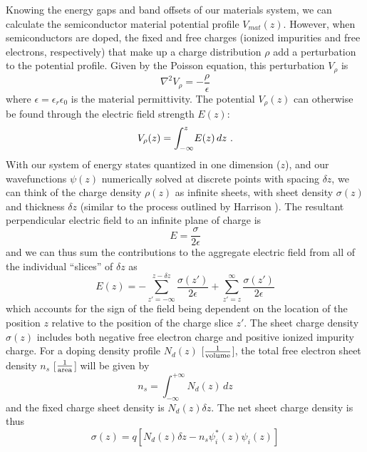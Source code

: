 \documentclass[12pt]{report}
\begin{document}
Knowing the energy gaps and band offsets of our materials system, we can calculate the semiconductor material potential profile $V_{mat}(z)$. However, when semiconductors are doped, the fixed and free charges (ionized impurities and free electrons, respectively) that make up a charge distribution $\rho$ add a perturbation to the potential profile.  Given by the Poisson equation, this perturbation $V_\rho$ is
\begin{equation}
\nabla^2 V_\rho = -\frac{\rho}{\epsilon}
\end{equation}
where $\epsilon = \epsilon_r \epsilon_0$ is the material permittivity.  The potential $V_\rho(z)$ can otherwise be found through the electric field strength $E(z)$:
\begin{equation}
V_\rho(z)=\int_{-\infty}^z\!E(z)\,dz \textnormal{~.}
\end{equation}
With our system of energy states quantized in one dimension ($z$), and our wavefunctions $\psi(z)$ numerically solved at discrete points with spacing $\delta\!z$, we can think of the charge density $\rho(z)$ as infinite sheets, with sheet density $\sigma(z)$ and thickness $\delta\!z$ (similar to the process outlined by Harrison \cite{Harrison}).  The resultant perpendicular electric field to an infinite plane of charge is
\begin{equation}
E = \frac{\sigma}{2 \epsilon}
\end{equation}
and we can thus sum the contributions to the aggregate electric field from all of the individual ``slices'' of $\delta\!z$ as
\begin{equation}
E(z) = - \sum_{z'=-\infty}^{z-\delta\!z} \frac{\sigma(z')}{2\epsilon} +  \sum_{z'=z}^{\infty} \frac{\sigma(z')}{2\epsilon}
\end{equation}
which accounts for the sign of the field being dependent on the location of the position $z$ relative to the position of the charge slice $z'$.  The sheet charge density $\sigma(z)$ includes both negative free electron charge and positive ionized impurity charge.  For a doping density profile $N_d(z)$ [$\frac{1}{\textnormal{volume}}$], the total free electron sheet density $n_s$ [$\frac{1}{\textnormal{area}}$] will be given by
\begin{equation}
n_s = \int_{-\infty}^{+\infty} \! N_d(z) \, dz
\end{equation}
and the fixed charge sheet density is $N_d(z) \delta\!z$.  The net sheet charge density is thus
\begin{equation}
\sigma(z) = q \left[N_d(z) \delta\!z - n_s \psi_i^*(z) \psi_i(z) \right]
\end{equation}
\end{document}
